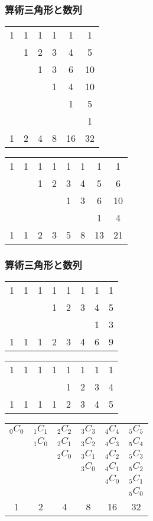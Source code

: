 \documentclass[dvipdfmx,12pt]{beamer}
\begin{document}
\begin{frame}
\frametitle{算術三角形と数列}
\begin{multicols}{2}
\begin{table}[htb]
\begin{tabular}{cccccc}
1&1&1&1&1&1\\
&1&2&3&4&5\\
&&1&3&6&10\\
&&&1&4&10\\
&&&&1&5\\
&&&&&1\\ \hline
1&2&4&8&16&32
\end{tabular}
\end{table}
\begin{table}[htb]
\begin{tabular}{cccccccc}
1&1&1&1&1&1&1&1\\
&&1&2&3&4&5&6\\
&&&&1&3&6&10\\
&&&&&&1&4\\ \hline
1&1&2&3&5&8&13&21
\end{tabular}
\end{table}
\end{multicols}

\end{frame}

\begin{frame}
\frametitle{算術三角形と数列}
\begin{multicols}{2}
\begin{table}[htb]
\begin{tabular}{cccccccc}
1&1&1&1&1&1&1&1\\
&&&1&2&3&4&5\\
&&&&&&1&3\\ \hline
1&1&1&2&3&4&6&9
\end{tabular}
\end{table}
\begin{table}[htb]
\begin{tabular}{cccccccc}
1&1&1&1&1&1&1&1\\
&&&&1&2&3&4\\ \hline
1&1&1&1&2&3&4&5
\end{tabular}
\end{table}
\end{multicols}

\end{frame}


\begin{frame}
\begin{table}[htb]
\begin{tabular}{cccccc}
${_0C_0}$&${_1C_1}$&${_2C_2}$&${_3C_3}$&${_4C_4}$&${_5C_5}$\\
&${_1C_0}$&${_2C_1}$&${_3C_2}$&${_4C_3}$&${_5C_4}$\\
&&${_2C_0}$&${_3C_1}$&${_4C_2}$&${_5C_3}$\\
&&&${_3C_0}$&${_4C_1}$&${_5C_2}$\\
&&&&${_4C_0}$&${_5C_1}$\\
&&&&&${_5C_0}$\\ \hline
1&2&4&8&16&32
\end{tabular}
\end{table}
\end{frame}
\end{document}
